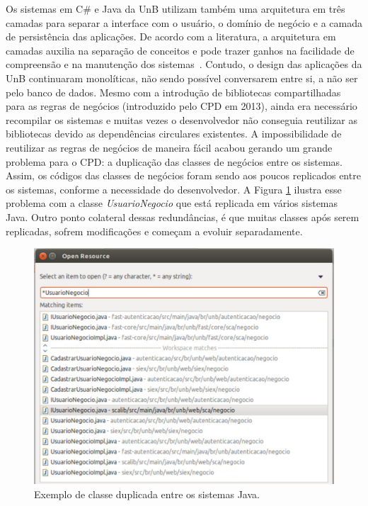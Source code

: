 Os sistemas em C\# e Java da \acrshort{UnB} utilizam também uma arquitetura em três camadas para separar a interface com o usuário, o domínio de negócio e a camada de persistência das aplicações. De acordo com a literatura, a arquitetura em camadas auxilia na separação de conceitos e pode trazer ganhos na facilidade de compreensão e na manutenção dos sistemas~\cite{clements2002documenting}. Contudo, o design das aplicações da \acrshort{UnB} continuaram monolíticas, não sendo possível conversarem entre si, a não ser pelo banco de dados. Mesmo com a introdução de bibliotecas compartilhadas para as regras de negócios (introduzido pelo CPD em 2013), ainda era necessário recompilar os sistemas e muitas vezes o desenvolvedor não conseguia reutilizar as bibliotecas devido as dependências circulares existentes. A impossibilidade de reutilizar as regras de negócios de maneira fácil acabou gerando um grande problema para o CPD: a duplicação das classes de negócios entre os sistemas. Assim, os códigos das classes de negócios foram sendo aos poucos replicados entre os sistemas, conforme a necessidade do desenvolvedor. A Figura \ref{fig:duplicidade_usuario_negocio} ilustra esse problema com a classe \emph{UsuarioNegocio} que está replicada em vários sistemas Java. Outro ponto colateral dessas redundâncias, é que muitas classes após serem replicadas, sofrem modificações e começam a evoluir separadamente.

\begin{figure}[ht]
\centering
\includegraphics[scale=0.8]{img/avaliacao/QP2/duplicidade_usuario_negocio.pdf}
\caption{Exemplo de classe duplicada entre os sistemas Java.}
\label{fig:duplicidade_usuario_negocio}
\end{figure}

